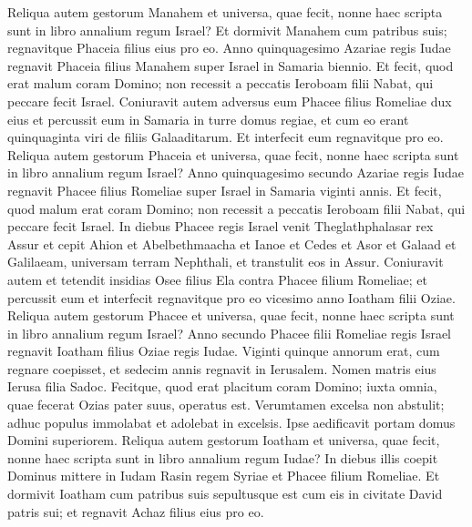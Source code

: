 \begin{biblechapter}
\begin{biblechapter}
\begin{biblechapter}
\begin{biblechapter}
\begin{biblechapter}
\begin{biblechapter}
\begin{biblechapter}
\begin{biblechapter}
\begin{biblechapter}
\begin{biblechapter}
\begin{biblechapter}
\begin{biblechapter}
\begin{biblechapter}
\begin{biblechapter}
\begin{biblechapter}
 \verse Reliqua autem gestorum Manahem et universa, quae fecit, nonne haec scripta sunt in libro annalium regum Israel? 
\verse Et dormivit Manahem cum patribus suis; regnavitque Phaceia filius eius pro eo.
 \verse Anno quinquagesimo Azariae regis Iudae regnavit Phaceia filius Manahem super Israel in Samaria biennio. 
\verse Et fecit, quod erat malum coram Domino; non recessit a peccatis Ieroboam filii Nabat, qui peccare fecit Israel. 
\verse Coniuravit autem adversus eum Phacee filius Romeliae dux eius et percussit eum in Samaria in turre domus regiae, et cum eo erant quinquaginta viri de filiis Galaaditarum. Et interfecit eum regnavitque pro eo.
 \verse Reliqua autem gestorum Phaceia et universa, quae fecit, nonne haec scripta sunt in libro annalium regum Israel?
 \verse Anno quinquagesimo secundo Azariae regis Iudae regnavit Phacee filius Romeliae super Israel in Samaria viginti annis. 
\verse Et fecit, quod malum erat coram Domino; non recessit a peccatis Ieroboam filii Nabat, qui peccare fecit Israel. 
\verse In diebus Phacee regis Israel venit Theglathphalasar rex Assur et cepit Ahion et Abelbethmaacha et Ianoe et Cedes et Asor et Galaad et Galilaeam, universam terram Nephthali, et transtulit eos in Assur. 
\verse Coniuravit autem et tetendit insidias Osee filius Ela contra Phacee filium Romeliae; et percussit eum et interfecit regnavitque pro eo vicesimo anno Ioatham filii Oziae.
 \verse Reliqua autem gestorum Phacee et universa, quae fecit, nonne haec scripta sunt in libro annalium regum Israel?
 \verse Anno secundo Phacee filii Romeliae regis Israel regnavit Ioatham filius Oziae regis Iudae. 
\verse Viginti quinque annorum erat, cum regnare coepisset, et sedecim annis regnavit in Ierusalem. Nomen matris eius Ierusa filia Sadoc. 
 \verse Fecitque, quod erat placitum coram Domino; iuxta omnia, quae fecerat Ozias pater suus, operatus est. 
\verse Verumtamen excelsa non abstulit; adhuc populus immolabat et adolebat in excelsis. Ipse aedificavit portam domus Domini superiorem.
 \verse Reliqua autem gestorum Ioatham et universa, quae fecit, nonne haec scripta sunt in libro annalium regum Iudae? 
\verse In diebus illis coepit Dominus mittere in Iudam Rasin regem Syriae et Phacee filium Romeliae. 
\verse Et dormivit Ioatham cum patribus suis sepultusque est cum eis in civitate David patris sui; et regnavit Achaz filius eius pro eo.
 

\end{biblechapter}
\end{biblechapter}
\end{biblechapter}
\end{biblechapter}
\end{biblechapter}
\end{biblechapter}
\end{biblechapter}
\end{biblechapter}
\end{biblechapter}
\end{biblechapter}
\end{biblechapter}
\end{biblechapter}
\end{biblechapter}
\end{biblechapter}
\end{biblechapter}
